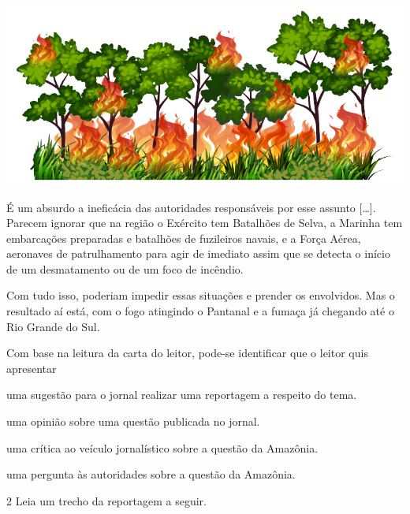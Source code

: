 \begin{conteudo}
\begin{conteudo}
\begin{conteudo}
\begin{conteudo}
\begin{conteudo}
\begin{myquote}
\begin{center}
\includegraphics[width=\textwidth]{media/image28b.png}
\end{center}

É um absurdo a ineficácia das autoridades responsáveis por esse assunto
{[}\ldots{}{]}. Parecem ignorar que na região o Exército tem Batalhões
de Selva, a Marinha tem embarcações preparadas e batalhões de fuzileiros
navais, e a Força Aérea, aeronaves de patrulhamento para agir de
imediato assim que se detecta o início de um desmatamento ou de um foco
de incêndio.

Com tudo isso, poderiam impedir essas situações e prender os envolvidos.
Mas o resultado aí está, com o fogo atingindo o Pantanal e a fumaça já
chegando até o Rio Grande do Sul.

\end{myquote}

Com base na leitura da carta do leitor, pode-se identificar que o leitor
quis apresentar

\begin{escolha}
\item uma sugestão para o jornal realizar uma reportagem a respeito do tema.

\item uma opinião sobre uma questão publicada no jornal.

\item uma crítica ao veículo jornalístico sobre a questão da Amazônia.

\item uma pergunta às autoridades sobre a questão da Amazônia.
\end{escolha}

\pagebreak
\num{2} Leia um trecho da reportagem a seguir.


\end{conteudo}
\end{conteudo}
\end{conteudo}
\end{conteudo}
\end{conteudo}
